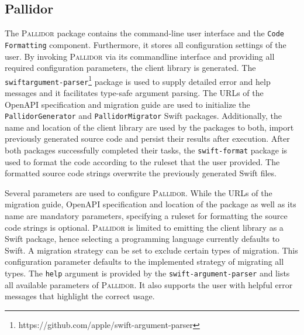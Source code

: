 \subsection{Pallidor}\label{subsec:Pallidor}
The \textsc{Pallidor} package contains the command-line user interface and the \texttt{Code\- Formatting} component. Furthermore, it stores all configuration settings of the user. By invoking \textsc{Pallidor} via its commandline interface and providing all required configuration parameters, the client library is generated. The \texttt{swift\-argument-parser}\footnote{https://github.com/apple/swift-argument-parser} package is used to supply detailed error and help messages and it facilitates type-safe argument parsing. The URLs of the OpenAPI specification and migration guide are used to initialize the \texttt{Pallidor\-Generator} and \texttt{Pallidor\-Migrator} Swift packages. Additionally, the name and location of the client library are used by the packages to both, import previously generated source code and persist their results after execution. After both packages successfully completed their tasks, the \texttt{swift-format} package is used to format the code according to the ruleset that the user provided. The formatted source code strings overwrite the previously generated Swift files.

Several parameters are used to configure \textsc{Pallidor}. While the URLs of the migration guide, OpenAPI specification and location of the package as well as its name are mandatory parameters, specifying a ruleset for formatting the source code strings is optional. \textsc{Pallidor} is limited to emitting the client library as a Swift package, hence selecting a programming language currently defaults to Swift. A migration strategy can be set to exclude certain types of migration. This configuration parameter defaults to the implemented strategy of migrating all types. The \texttt{help} argument is provided by the \texttt{swift-argument-parser} and lists all available parameters of \textsc{Pallidor}. It also supports the user with helpful error messages that highlight the correct usage.


